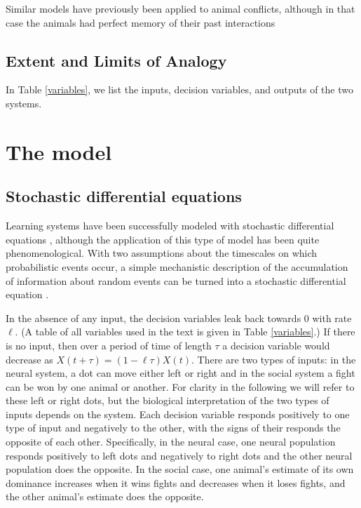 \documentclass{article}
\begin{document}
Similar models have previously been applied to animal conflicts, although in that case the animals had perfect memory of their past interactions \citep{Froment:2010fk}

\subsection{Extent and Limits of Analogy }

In Table \ref{variables}, we list the inputs, decision variables, and outputs of the two systems.  

\section{The model \label{derivation}}
\subsection{Stochastic differential equations }
Learning systems have been successfully modeled with stochastic differential equations \citep{Eckhoff:2008uq, Brown:2005fk,Feng:2009kl,Bogacz:2006uq}, although the application of this type of model has been quite phenomenological.  With two assumptions about the timescales on which probabilistic events occur, a simple mechanistic description of the accumulation of information about random events can be turned into a stochastic differential equation \cite{Gillespie:2000fk}.  


In the absence of any input, the decision variables leak back towards $0$ with rate $\ell$.  (A table of all variables used in the text is given in Table \ref{variables}.)  If there is no input, then over a period of time of length $\tau$ a decision variable would decrease as $X(t+\tau)=(1-\ell\tau)X(t)$.  There are two types of inputs: in the neural system, a dot can move either left or right and in the social system a fight can be won by one animal or another.  For clarity in the following we will refer to these left or right dots, but the biological interpretation of the two types of inputs depends on the system.  Each decision variable responds positively to one type of input and negatively to the other, with the signs of their responds the opposite of each other.  Specifically, in the neural case, one neural population responds positively to left dots and negatively to right dots and the other neural population does the opposite.  In the social case, one animal's estimate of its own dominance increases when it wins fights and decreases when it loses fights, and the other animal's estimate does the opposite.  
\end{document}
